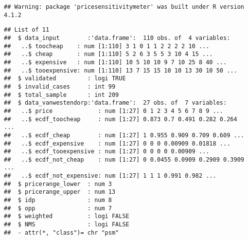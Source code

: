 \documentclass[
]{article}
\newenvironment{Shaded}{\begin{snugshade}}{\end{snugshade}}
\newcommand{\AttributeTok}[1]{\textcolor[rgb]{0.77,0.63,0.00}{#1}}
\newcommand{\ConstantTok}[1]{\textcolor[rgb]{0.00,0.00,0.00}{#1}}
\newcommand{\FunctionTok}[1]{\textcolor[rgb]{0.00,0.00,0.00}{#1}}
\newcommand{\NormalTok}[1]{#1}
\newcommand{\OtherTok}[1]{\textcolor[rgb]{0.56,0.35,0.01}{#1}}
\newcommand{\SpecialCharTok}[1]{\textcolor[rgb]{0.00,0.00,0.00}{#1}}
\begin{document}
\begin{verbatim}
## Warning: package 'pricesensitivitymeter' was built under R version 4.1.2
\end{verbatim}

\begin{Shaded}
\end{Shaded}

\begin{verbatim}
## List of 11
##  $ data_input        :'data.frame':  110 obs. of  4 variables:
##   ..$ toocheap    : num [1:110] 3 1 0 1 1 2 2 2 2 10 ...
##   ..$ cheap       : num [1:110] 5 2 6 3 5 5 3 10 4 15 ...
##   ..$ expensive   : num [1:110] 10 5 10 10 9 7 10 25 8 40 ...
##   ..$ tooexpensive: num [1:110] 13 7 15 15 10 10 13 30 10 50 ...
##  $ validated         : logi TRUE
##  $ invalid_cases     : int 99
##  $ total_sample      : int 209
##  $ data_vanwestendorp:'data.frame':  27 obs. of  7 variables:
##   ..$ price             : num [1:27] 0 1 2 3 4 5 6 7 8 9 ...
##   ..$ ecdf_toocheap     : num [1:27] 0.873 0.7 0.491 0.282 0.264 ...
##   ..$ ecdf_cheap        : num [1:27] 1 0.955 0.909 0.709 0.609 ...
##   ..$ ecdf_expensive    : num [1:27] 0 0 0 0.00909 0.01818 ...
##   ..$ ecdf_tooexpensive : num [1:27] 0 0 0 0 0.00909 ...
##   ..$ ecdf_not_cheap    : num [1:27] 0 0.0455 0.0909 0.2909 0.3909 ...
##   ..$ ecdf_not_expensive: num [1:27] 1 1 1 0.991 0.982 ...
##  $ pricerange_lower  : num 3
##  $ pricerange_upper  : num 13
##  $ idp               : num 8
##  $ opp               : num 7
##  $ weighted          : logi FALSE
##  $ NMS               : logi FALSE
##  - attr(*, "class")= chr "psm"
\end{verbatim}

\begin{Shaded}
\end{Shaded}
\end{document}
